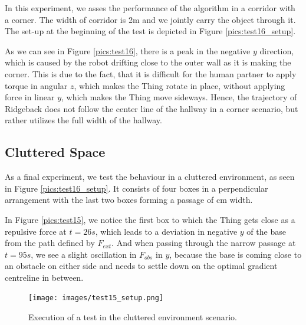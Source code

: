 In this experiment, we asses the performance of the algorithm in a corridor with a corner. The width of corridor is \unit{2}{m} and we jointly carry the object through it. The set-up at the beginning of the test is depicted in Figure \ref{pics:test16_setup}.

As we can see in Figure \ref{pics:test16}, there is a peak in the negative $y$ direction, which is caused by the robot drifting close to the outer wall as it is making the corner. This is due to the fact, that it is difficult for the human partner to apply torque in angular $z$, which makes the Thing rotate in place, without applying force in linear $y$, which makes the Thing move sideways. Hence, the trajectory of Ridgeback does not follow the center line of the hallway in a corner scenario, but rather utilizes the full width of the hallway.

\subsection{Cluttered Space}
As a final experiment, we test the behaviour in a cluttered environment, as seen in Figure \ref{pics:test16_setup}. It consists of four boxes in a perpendicular arrangement with the last two boxes forming a passage of \unit[120]{cm} width.

In Figure \ref{pics:test15}, we notice the first box to which the Thing gets close as a repulsive force at $t = 26s$, which leads to a deviation in negative $y$ of the base from the path defined by $F_{ext}$. And when passing through the narrow passage at $t = 95s$, we see a slight oscillation in $F_{obs}$ in $y$, because the base is coming close to an obstacle on either side and needs to settle down on the optimal gradient centreline in between.

\newpage

\begin{figure}
   \centering
   \texttt{[image: images/test15\_setup.png]}
   \caption{Execution of a test in the cluttered environment scenario.}
   \label{pics:test15_setup}
\end{figure}

